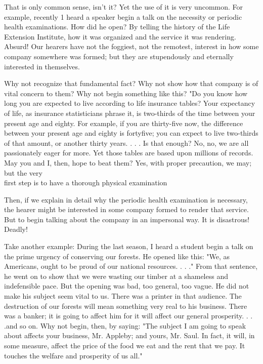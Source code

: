 \documentclass[10pt]{article}
\begin{document}
That is only common sense, isn't it? Yet the use of it is very uncommon. For example, recently 1 heard a speaker begin a talk on the necessity or periodic health examinations. How did he open? By telling the history of the Life Extension Institute, how it was organized and the service it was rendering. Absurd! Our hearers have not the foggiest, not the remotest, interest in how some company somewhere was formed; but they are stupendously and eternally interested in themselves.

Why not recognize that fundamental fact? Why not show how that company is of vital concern to them? Why not begin something like this? "Do you know how long you are expected to live according to life insurance tables? Your expectancy of life, as insurance statisticians phrase it, is two-thirds of the time between your present age and eighty. For example, if you are thirty-five now, the difference between your present age and eighty is fortyfive; you can expect to live two-thirds of that amount, or another thirty years. . . . Is that enough? No, no, we are all passionately eager for more. Yet those tables are based upon millions of records. May you and I, then, hope to beat them? Yes, with proper precaution, we may; but the very\\
first step is to have a thorough physical examination

Then, if we explain in detail why the periodic health examination is necessary, the hearer might be interested in some company formed to render that service. But to begin talking about the company in an impersonal way. It is disastrous! Deadly!

Take another example: During the last season, I heard a student begin a talk on the prime urgency of conserving our forests. He opened like this: "We, as Americans, ought to be proud of our national resources. . . ." From that sentence, he went on to show that we were wasting our timber at a shameless and indefensible pace. But the opening was bad, too general, too vague. He did not make his subject seem vital to us. There was a printer in that audience. The destruction of our forests will mean something very real to his business. There was a banker; it is going to affect him for it will affect our general prosperity. . . .and so on. Why not begin, then, by saying: "The subject I am going to speak about affects your business, Mr. Appleby; and yours, Mr. Saul. In fact, it will, in some measure, affect the price of the food we eat and the rent that we pay. It touches the welfare and prosperity of us all."
\end{document}
